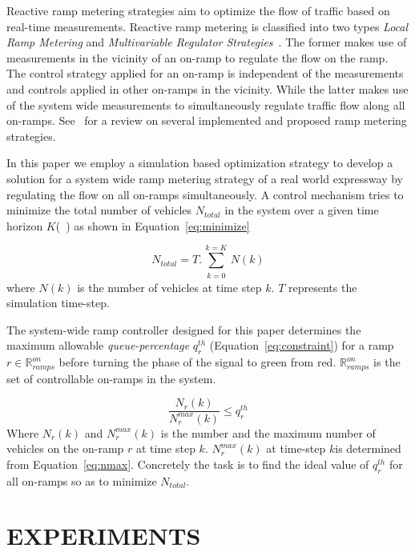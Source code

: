 \documentclass{wscpaperproc}
\theoremstyle{wsc}
\begin{document}
Reactive ramp metering strategies aim to optimize the flow of traffic based on real-time measurements. Reactive ramp metering is classified into two types {\it Local Ramp Metering} and {\it Multivariable Regulator Strategies}~.  The former makes use of measurements in the vicinity of an on-ramp to regulate the flow on the ramp. The control strategy applied for an on-ramp is independent of the measurements and controls applied in other on-ramps in the vicinity. While the latter makes use of the system wide measurements to simultaneously regulate traffic flow along all on-ramps. See~\cite{bogenberger1999advanced} for a review on several implemented and proposed ramp metering strategies.

In this paper we employ a simulation based optimization strategy to develop a solution for a system wide ramp metering strategy of a real world expressway by regulating the flow on all on-ramps simultaneously. A control mechanism tries to minimize the total number of vehicles $N_{total}$ in the system over a given time horizon $K$(~) as shown in Equation~\ref{eq:minimize}

\begin{equation}
\label{eq:minimize}
N_{total}=T.\sum\limits_{\substack{k=0}}^{k=K}N(k)
\end{equation}
where $N(k)$ is the number of vehicles at time step $k$. $T$ represents the simulation time-step.


The system-wide ramp controller designed for this paper determines the maximum allowable {\it queue-percentage} $q^{th}_r$ (Equation~\ref{eq:constraint}) for a ramp $r\in \mathbb{R}^{on}_{ramps}$ before turning the phase of the signal to green from red.  $\mathbb{R}^{on}_{ramps}$ is the set of controllable on-ramps in the system.

 \begin{equation}
 \label{eq:constraint}
\frac{N_r(k)}{N^{max}_r(k)}\le q^{th}_r
 \end{equation}
 Where $N_r(k)$ and $N^{max}_r(k)$ is the number and the maximum number of vehicles on the on-ramp $r$ at time step $k$. $N^{max}_r(k)$ at time-step $k$is determined from Equation~\ref{eq:nmax}. Concretely the task is to find the ideal value of $q^{th}_r$ for all on-ramps so as to minimize $N_{total}$.


\section{EXPERIMENTS}
\label{sec:experiments}
\end{document}
